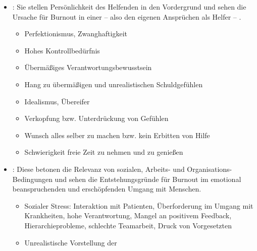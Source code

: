 \begin{itemize}
  \item {}: Sie stellen
  Persönlichkeit des Helfenden in den Vordergrund und sehen
  die Ursache für Burnout in einer  -- also den eigenen Ansprüchen als Helfer --
  .
  
  \begin{itemize}
    \item Perfektionismus, Zwanghaftigkeit
    \item Hohes Kontrollbedürfnis
    \item Übermäßiges Verantwortungsbewusstsein
    \item Hang zu übermäßigen und unrealistischen Schuldgefühlen
    \item Idealismus, Übereifer
    \item Verkopfung bzw. Unterdrückung von Gefühlen
    \item Wunsch alles selber zu machen bzw. kein Erbitten von Hilfe
    \item Schwierigkeit freie Zeit zu nehmen und zu genießen
  \end{itemize}
  \item {}: Diese betonen die
  Relevanz von sozialen, Arbeits- und
  Organisations-Bedingungen und sehen die Entstehungsgründe
  für Burnout im emotional beanspruchenden und
  erschöpfenden Umgang mit Menschen.
  \begin{itemize}
    \item Sozialer Stress: Interaktion mit Patienten,
    Überforderung im Umgang mit
    Krankheiten, hohe Verantwortung, Mangel an positivem
    Feedback, Hierarchieprobleme, schlechte Teamarbeit, Druck
    von Vorgesetzten
    \item Unrealistische Vorstellung der

\end{itemize}
\end{itemize}
